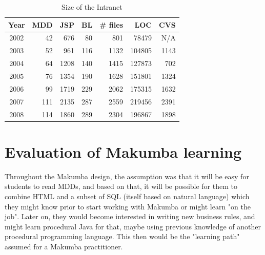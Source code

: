 \documentclass{chi2009}
\begin{document}
\begin{table}[t]
	\centering
	\begin{tabular}{c|r|r|r|r|r|r}
		\hline
		\hline
		Year	& MDD	& JSP	& BL	& \# files	& LOC		& CVS	 \\
		\hline
		\hline
		2002 	& 42	& 676	& 80	& 801		& 78479 	& N/A	 \\ 
		\hline
		2003 	& 52	& 961	& 116	& 1132		& 104805 	& 1143	 \\ 
		\hline
		2004 	& 64	& 1208	& 140	& 1415		& 127873 	& 702	 \\ 
		\hline
		2005 	& 76	& 1354	& 190	& 1628		& 151801 	& 1324	 \\ 
		\hline
		2006 	& 99	& 1719	& 229	& 2062		& 175315 	& 1632	 \\ 
		\hline
		2007 	& 111	& 2135	& 287	& 2559		& 219456 	& 2391	 \\ 
		\hline
		2008 	& 114	& 1860	& 289	& 2304		& 196867 	& 1898	 \\ 
		\hline
		
		\hline
		\hline
	\end{tabular}
	\caption{Size of the Intranet}
	\label{tab:intranet-size}
\end{table} 

\section{Evaluation of Makumba learning}\label{sec:techCommittee}
Throughout the Makumba design, the assumption was that it will be easy for students to read MDDs, and based on that, it will be possible for them to combine HTML and a subset of SQL (itself based on natural language) which they might know prior to start working with Makumba or might learn "on the job". Later on, they would become interested in writing new business rules, and might learn procedural Java for that, maybe using previous knowledge of another procedural programming language. This then would be the "learning path" assumed for a Makumba practitioner.
\end{document}
